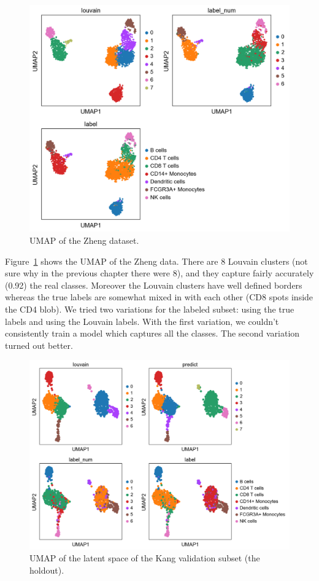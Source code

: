 \documentclass[11pt, a4paper]{report}
\theoremstyle{plain}
\theoremstyle{definition}
\theoremstyle{remark}
\begin{document}
\begin{figure}[h]
\centering
\includegraphics[width=1.1\textwidth]{images/gmmvae_zheng_new_louvain_umap1.png}
\caption{
UMAP of the Zheng dataset.
}
\label{fig:zheng_pca_umap_new}
\end{figure}

Figure~\ref{fig:zheng_pca_umap_new} shows the UMAP of the Zheng data.
There are 8 Louvain clusters (not sure why in the previous chapter there were
8), and they capture fairly accurately (0.92) the real classes.
Moreover the Louvain clusters have well defined borders whereas the true labels
are somewhat mixed in with each other (CD8 spots inside the CD4 blob).
We tried two variations for the labeled subset: using the true labels and using
the Louvain labels.
With the first variation, we couldn't consistently train a model which captures
all the classes.
The second variation turned out better.

\begin{figure}[h]
\centering
\includegraphics[width=1.1\textwidth]{images/gmmvae_kang_new_latent_louvain_pred_umap1.png}
\caption{
UMAP of the latent space of the Kang validation subset (the holdout).
}
\label{fig:kang_new_latent}
\end{figure}
\end{document}
